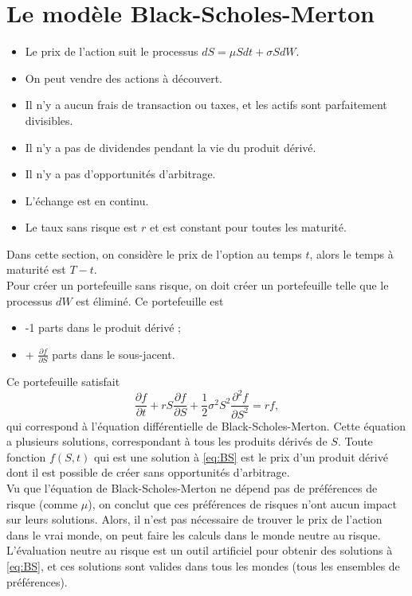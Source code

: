 \section{Le modèle Black-Scholes-Merton}

\begin{itemize}
	\item Le prix de l'action suit le processus $dS = \mu S dt + \sigma S dW$.
	\item On peut vendre des actions à découvert.
	\item Il n'y a aucun frais de transaction ou taxes, et les actifs sont parfaitement divisibles. 
	\item Il n'y a pas de dividendes pendant la vie du produit dérivé.
	\item Il n'y a pas d'opportunités d'arbitrage.
	\item L'échange est en continu.
	\item Le taux sans risque est $r$ et est constant pour toutes les maturité.
\end{itemize}

Dans cette section, on considère le prix de l'option au temps $t$, alors le temps à maturité est $T - t$. \\

Pour créer un portefeuille sans risque, on doit créer un portefeuille telle que le processus $dW$ est éliminé. Ce portefeuille est 
\begin{itemize}
	\item -1 parts dans le produit dérivé ;
	\item + $\frac{\partial f}{\partial S}$ parts dans le sous-jacent. 
\end{itemize}
Ce portefeuille satisfait 
\begin{equation}\label{eq:BS}
\frac{\partial f}{\partial t} + rS \frac{\partial f}{\partial S} + \frac{1}{2} \sigma^2 S^2 \frac{\partial^2 f}{\partial S^2} = rf,
\end{equation}
qui correspond à l'équation différentielle de Black-Scholes-Merton. Cette équation a plusieurs solutions, correspondant à tous les produits dérivés de $S$. Toute fonction $f(S, t)$ qui est une solution à \eqref{eq:BS} est le prix d'un produit dérivé dont il est possible de créer sans opportunités d'arbitrage. \\

Vu que l'équation de Black-Scholes-Merton ne dépend pas de préférences de risque (comme $\mu$), on conclut que ces préférences de risques n'ont aucun impact sur leurs solutions. Alors, il n'est pas nécessaire de trouver le prix de l'action dans le vrai monde, on peut faire les calculs dans le monde neutre au risque. L'évaluation neutre au risque est un outil artificiel pour obtenir des solutions à \eqref{eq:BS}, et ces solutions sont valides dans tous les mondes (tous les ensembles de préférences). 

